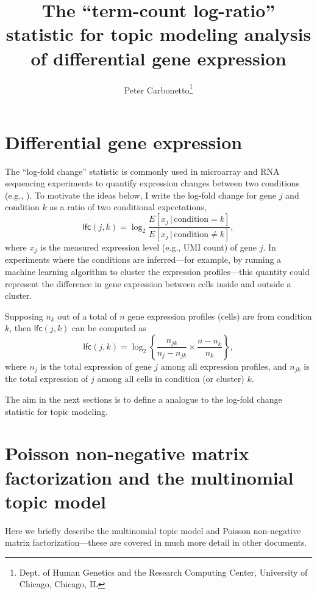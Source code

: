 \documentclass[final]{siamart171218}
\title{The ``term-count log-ratio'' statistic for topic modeling analysis
  of differential gene expression}
\author{Peter Carbonetto\thanks{Dept. of Human Genetics and the Research Computing Center, University of Chicago, Chicago, IL}}
\begin{document}
\maketitle

\section{Differential gene expression}

The ``log-fold change'' statistic is commonly used in microarray and
RNA sequencing experiments to quantify expression changes between two
conditions (e.g., \cite{cui-churchill-2003, quackenbush-2002}). To
motivate the ideas below, I write the log-fold change for gene $j$
and condition $k$ as a ratio of two conditional expectations,
\begin{equation}
\mathsf{lfc}(j,k) = \log_2 \frac{E[x_j \,|\, \mathrm{condition} = k]}
                                {E[x_j \,|\, \mathrm{condition} \neq k]},
\end{equation}
where $x_j$ is the measured expression level (e.g., UMI count) of gene
$j$. In experiments where the conditions are inferred---for example,
by running a machine learning algorithm to cluster the expression
profiles---this quantity could represent the difference in gene
expression between cells inside and outside a cluster.

Supposing $n_k$ out of a total of $n$ gene expression profiles
(cells) are from condition $k$, then $\mathsf{lfc}(j,k)$ can be
computed as
\begin{equation}
\mathsf{lfc}(j,k) =
\log_2 \left\{\frac{n_{jk}}{n_j - n_{jk}} \times \frac{n - n_k}{n_k} \right\},
\end{equation}
where $n_j$ is the total expression of gene $j$ among all expression
profiles, and $n_{jk}$ is the total expression of $j$ among all cells
in condition (or cluster) $k$.

The aim in the next sections is to define a analogue to the log-fold
change statistic for topic modeling.

\section{Poisson non-negative matrix factorization and the multinomial
  topic model}

Here we briefly describe the multinomial topic model and Poisson
non-negative matrix factorization---these are covered in much more
detail in other documents.
\end{document}
